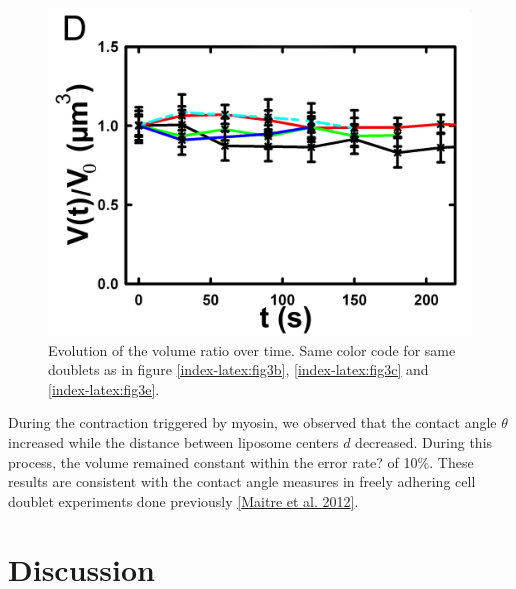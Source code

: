 \documentclass[A4paperpaper,11pt,english]{sphinxmanual}
\begin{document}
\begin{figure}[htbp]
\centering
\capstart

\includegraphics[width=0.500\linewidth]{Fig_03-D.png}
\caption{Evolution of the volume ratio over time.
Same color code for same doublets as in figure \hyperref[index-latex:fig3b]{ \ref*{index-latex:fig3b}}, \hyperref[index-latex:fig3c]{ \ref*{index-latex:fig3c}}
and \hyperref[index-latex:fig3e]{ \ref*{index-latex:fig3e}}.}\label{index-latex:fig3d}\end{figure}

During the contraction triggered by myosin, we observed that the contact angle
\(\theta\) increased while the distance between liposome centers \(d\) decreased.
During this process, the volume remained constant within the error rate? of 10\%.  These
results are consistent with the contact angle measures in freely adhering cell
doublet experiments done previously {\hyperref[index-latex:maitre2012]{{[}Maitre et al. 2012{]}}}.


\section{Discussion}
\label{index-latex:discussion}
\end{document}
